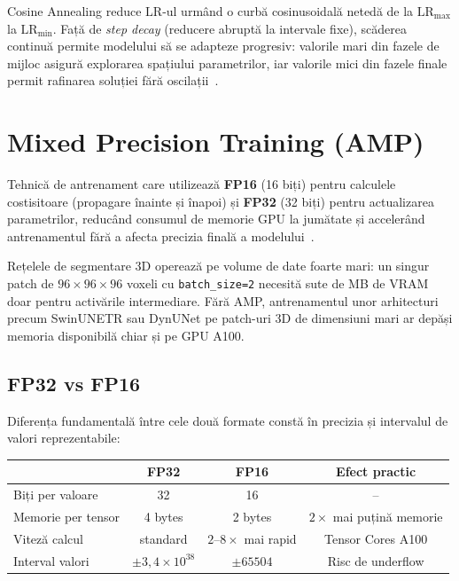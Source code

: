 \documentclass[12pt, a4paper]{report}
\begin{document}
Cosine Annealing reduce $\text{LR}$-ul urmând o curbă cosinusoidală
netedă de la $\text{LR}_{\max}$ la $\text{LR}_{\min}$. Față de
\textit{step decay} (reducere abruptă la intervale fixe), scăderea
continuă permite modelului să se adapteze progresiv: valorile mari
din fazele de mijloc asigură explorarea spațiului parametrilor, iar
valorile mici din fazele finale permit rafinarea soluției fără
oscilații~\cite{loshchilov2017sgdr}.


\section{Mixed Precision Training (AMP)}
\label{sec:amp}

\vspace{4pt}
\begin{infobox}
Tehnică de antrenament care utilizează \textbf{FP16} (16 biți) pentru
calculele costisitoare (propagare înainte și înapoi) și \textbf{FP32}
(32 biți) pentru actualizarea parametrilor, reducând consumul de
memorie GPU la jumătate și accelerând antrenamentul fără a afecta
precizia finală a modelului~\cite{micikevicius2018mixedprecision}.
\end{infobox}

Rețelele de segmentare 3D operează pe volume de date foarte mari:
un singur patch de $96 \times 96 \times 96$ voxeli cu \texttt{batch\_size=2}
necesită sute de MB de VRAM doar pentru activările intermediare.
Fără AMP, antrenamentul unor arhitecturi precum SwinUNETR sau DynUNet
pe patch-uri 3D de dimensiuni mari ar depăși memoria disponibilă
chiar și pe GPU A100.

\subsection{FP32 vs FP16}

Diferența fundamentală între cele două formate constă în precizia
și intervalul de valori reprezentabile:

\begin{center}
\begin{tabular}{lccc}
    \toprule
    & \textbf{FP32} & \textbf{FP16} & \textbf{Efect practic} \\
    \midrule
    Biți per valoare  & 32      & 16      & -- \\
    Memorie per tensor & 4 bytes & 2 bytes & $2\times$ mai puțină memorie \\
    Viteză calcul     & standard & $2$--$8\times$ mai rapid
                                 & Tensor Cores A100 \\
    Interval valori   & $\pm 3{,}4 \times 10^{38}$
                                 & $\pm 65504$
                                 & Risc de underflow \\
    \bottomrule
\end{tabular}
\end{center}
\end{document}
